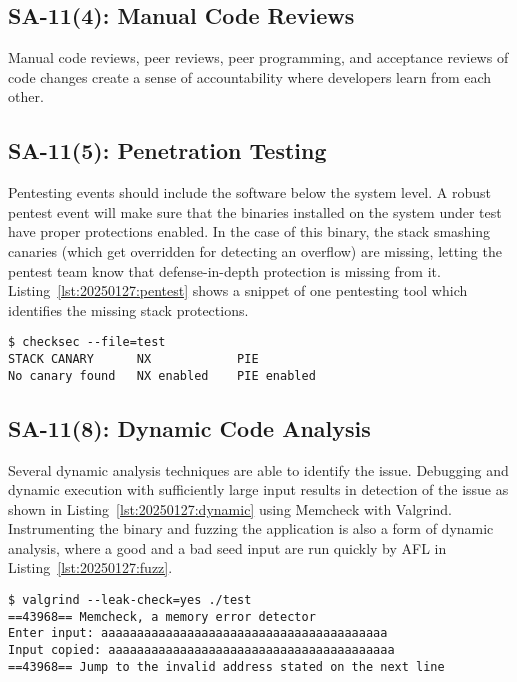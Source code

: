 \subsection*{SA-11(4): Manual Code Reviews}
Manual code reviews, peer reviews, peer programming, and acceptance reviews of code changes create a sense of accountability where developers learn from each other.

\subsection*{SA-11(5): Penetration Testing}
Pentesting events should include the software below the system level. A robust pentest event will make sure that the binaries installed on the system under test have proper protections enabled. In the case of this binary, the stack smashing canaries (which get overridden for detecting an overflow) are missing, letting the pentest team know that defense-in-depth protection is missing from it. Listing~\ref{lst:20250127:pentest} shows a snippet of one pentesting tool which identifies the missing stack protections.

\begin{lstlisting}[caption={Pentest Detection of Stack Protection},captionpos=b,style=BashStyle,label={lst:20250127:pentest}]
$ checksec --file=test
STACK CANARY      NX            PIE
No canary found   NX enabled    PIE enabled
\end{lstlisting}

\subsection*{SA-11(8): Dynamic Code Analysis}
Several dynamic analysis techniques are able to identify the issue. Debugging and dynamic execution with sufficiently large input results in detection of the issue as shown in Listing~\ref{lst:20250127:dynamic} using Memcheck with Valgrind. Instrumenting the binary and fuzzing the application is also a form of dynamic analysis, where a good and a bad seed input are run quickly by AFL in Listing~\ref{lst:20250127:fuzz}.

\begin{lstlisting}[caption={Valgrind Detection of Memory Overlap},captionpos=b,style=BashStyle,label={lst:20250127:dynamic}]
$ valgrind --leak-check=yes ./test
==43968== Memcheck, a memory error detector
Enter input: aaaaaaaaaaaaaaaaaaaaaaaaaaaaaaaaaaaaaaaa
Input copied: aaaaaaaaaaaaaaaaaaaaaaaaaaaaaaaaaaaaaaaa
==43968== Jump to the invalid address stated on the next line
\end{lstlisting}

